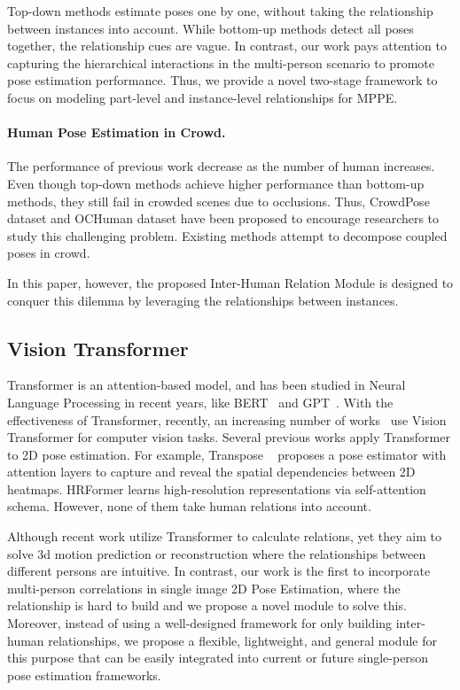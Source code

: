 \documentclass{article}
\begin{document}
Top-down methods estimate poses one by one, without taking the relationship between instances into account. While bottom-up methods detect all poses together, the relationship cues are vague. In contrast, our work pays attention to capturing the hierarchical interactions in the multi-person scenario to promote pose estimation performance. Thus, we provide a novel two-stage framework to focus on modeling part-level and instance-level relationships for MPPE.\\


\noindent\paragraph{Human Pose Estimation in Crowd.}
The performance of previous work decrease as the number of human increases.  Even though top-down methods achieve higher performance than bottom-up methods, they still fail in crowded scenes due to occlusions. Thus, CrowdPose dataset \cite{li2019crowdpose} and OCHuman dataset \cite{zhang2019pose2seg} have been proposed to encourage researchers to study this challenging problem. 
Existing methods \cite{li2019crowdpose,qiu2020peeking} attempt to decompose coupled poses in crowd. 


In this paper, however, the proposed Inter-Human Relation Module is designed to conquer this dilemma by leveraging the relationships between instances.

\subsection{Vision Transformer}
Transformer is an attention-based model, and has been studied in Neural Language Processing in recent years, like BERT~\cite{devlin2018bert} and GPT~\cite{radford2019language}. With the effectiveness of Transformer, recently, an increasing number of works~\cite{parmar2018image,bello2019attention,touvron2021training} use Vision Transformer for computer vision tasks. 
Several previous works apply Transformer to 2D pose estimation. For example, Transpose ~\cite{yang2021transpose} proposes a pose estimator with attention layers to capture and reveal the spatial dependencies between 2D heatmaps. HRFormer \cite{YuanFHLZCW21} learns high-resolution representations via self-attention schema. 
However, none of them take human relations into account.

Although recent work \cite{wang2021multi,Mihai2021rempis} utilize Transformer to calculate relations, yet they aim to solve 3d motion prediction or reconstruction where the relationships between different persons are intuitive. In contrast, our work is the first to incorporate multi-person correlations in single image 2D Pose Estimation, where the relationship is hard to build and we propose a novel module to solve this. Moreover, instead of using a well-designed framework for only building inter-human relationships, we propose a flexible, lightweight, and general module for this purpose that can be easily integrated into current or future single-person pose estimation frameworks.
\end{document}
